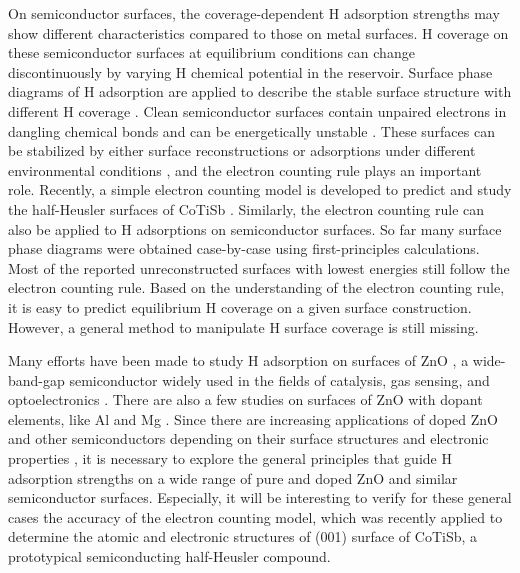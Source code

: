 On semiconductor surfaces, the coverage-dependent H adsorption strengths may show different characteristics compared to those on metal surfaces. H coverage on these semiconductor surfaces at equilibrium conditions can change discontinuously by varying H chemical potential in the reservoir. Surface phase diagrams of H adsorption are applied to describe the stable surface structure with different H coverage \cite{deWalle02GaN,wang2005hydrogen,lauritsen2011stabilization}. Clean semiconductor surfaces contain unpaired electrons in dangling chemical bonds and can be energetically unstable \cite{Harrison79, dulub2003novel,wander2001stability,hellstrom2017surface,calzolari2013dipolar}. These surfaces can be stabilized by either surface reconstructions or adsorptions under different environmental conditions \cite{Kaxiras87, meyer2004first,lauritsen2011stabilization,wahl2013stabilization,valtiner2009temperature,Jacobs16ZnO}, and the electron counting rule \cite{pashley1989electron} plays an important role. Recently, a simple electron counting model is developed to predict and study the half-Heusler surfaces of CoTiSb \cite{kawasaki2018simple}. Similarly, the electron counting rule can also be applied to H adsorptions on semiconductor surfaces. So far many surface phase diagrams were obtained case-by-case using first-principles calculations. Most of the reported unreconstructed surfaces with lowest energies \cite{meyer2004first,valtiner2009temperature,Jacobs16ZnO} still follow the electron counting rule. Based on the understanding of the electron counting rule, it is easy to predict equilibrium H coverage on a given surface construction. However, a general method to manipulate H surface coverage is still missing.

Many efforts have been made to study H adsorption on surfaces of ZnO \cite{Meyer03,meyer2004first,wang2005hydrogen,valtiner2009temperature,lauritsen2011stabilization, wahl2013stabilization, Jacobs16ZnO}, a wide-band-gap semiconductor widely used in the fields of catalysis, gas sensing, and optoelectronics \cite{Ozgur05_ZnO,Klingshirn07_ZnO}. There are also a few studies on surfaces of ZnO with dopant elements, like Al and Mg \cite{lin2009first, lahmer2015effect}. Since there are increasing applications of doped ZnO and other semiconductors depending on their surface structures and electronic properties \cite{Pan08_doped_ZnO, Georgekutty08_Ag_ZnO, lin2009first, Ling11_Sn-Doped, Buonsanti11_Al_ZnO, Kim14_doped, Hsu14_Ag_ZnO, Lin17_Ni_SnO2}, it is necessary to explore the general principles that guide H adsorption strengths on a wide range of pure and doped ZnO and similar semiconductor surfaces. Especially, it will be interesting to verify for these general cases the accuracy of the electron counting model, which was recently applied to determine the atomic and electronic structures of (001) surface of CoTiSb, a prototypical semiconducting half-Heusler compound\cite{kawasaki2018simple}.

